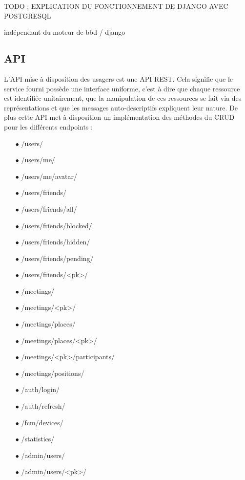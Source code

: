 \documentclass[french]{article}
\begin{document}
	
	
	
	 
	TODO : EXPLICATION DU FONCTIONNEMENT DE DJANGO AVEC POSTGRESQL
	
	
	
	indépendant du moteur de bbd / django
	
	
	\subsection{API}
	
	L'API mise à disposition des usagers est une API REST. Cela signifie que le service fourni possède une interface uniforme, c'est à dire que chaque ressource est identifiée unitairement, que la manipulation de ces ressources se fait via des représentations et que les messages auto-descriptifs expliquent leur nature. De plus cette API met à disposition un implémentation des méthodes du CRUD pour les différents endpoints : 
	\begin{itemize}
		\item[$\bullet$] /users/
		\item[$\bullet$] /users/me/
		\item[$\bullet$] /users/me/avatar/
		\item[$\bullet$] /users/friends/
		\item[$\bullet$] /users/friends/all/
		\item[$\bullet$] /users/friends/blocked/
		\item[$\bullet$] /users/friends/hidden/
		\item[$\bullet$] /users/friends/pending/
		\item[$\bullet$] /users/friends/<pk>/
		\item[$\bullet$] /meetings/
		\item[$\bullet$] /meetings/<pk>/
		\item[$\bullet$] /meetings/places/
		\item[$\bullet$] /meetings/places/<pk>/
		\item[$\bullet$] /meetings/<pk>/participants/
		\item[$\bullet$] /meetings/positions/
		\item[$\bullet$] /auth/login/
		\item[$\bullet$] /auth/refresh/
		\item[$\bullet$] /fcm/devices/
		\item[$\bullet$] /statistics/
		\item[$\bullet$] /admin/users/
		\item[$\bullet$] /admin/users/<pk>/
	\end{itemize}
		
\end{document}
